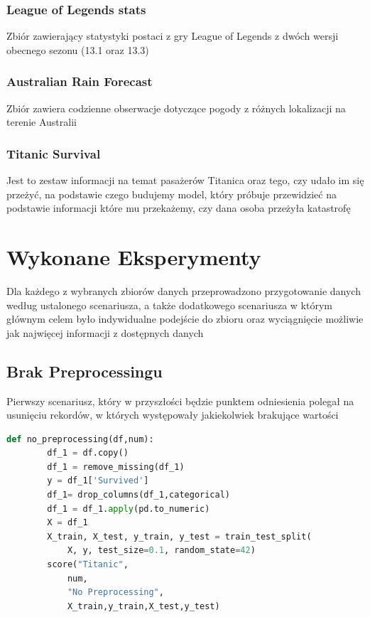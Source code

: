 \documentclass{book}
\begin{document}
\subsection{League of Legends stats}
Zbiór zawierający statystyki postaci z gry League of Legends z 
dwóch wersji obecnego sezonu (13.1 oraz 13.3)
\subsection{Australian Rain Forecast}
Zbiór zawiera codzienne obserwacje dotyczące pogody z różnych 
lokalizacji na terenie Australii
\subsection{Titanic Survival}
Jest to zestaw informacji na temat pasażerów Titanica oraz tego, 
czy udało im się przeżyć, na podstawie czego budujemy model, 
który próbuje przewidzieć na podstawie informacji które mu przekażemy, 
czy dana osoba przeżyła katastrofę

\chapter{Wykonane Eksperymenty}
Dla każdego z wybranych zbiorów danych przeprowadzono 
przygotowanie danych według ustalonego scenariusza, 
a także dodatkowego scenariusza w którym głównym celem było 
indywidualne podejście do zbioru oraz wyciągnięcie możliwie 
jak najwięcej informacji z dostępnych danych
\section{Brak Preprocessingu}
Pierwszy scenariusz, który w przyszłości 
będzie punktem odniesienia polegał na usunięciu rekordów, 
w których występowały jakiekolwiek brakujące wartości

\begin{lstlisting}[language=Python, caption={Brak przygotowania
     danych dla zbioru danych Titanic}, captionpos=b]
    def no_preprocessing(df,num):
        df_1 = df.copy()
        df_1 = remove_missing(df_1)
        y = df_1['Survived']
        df_1= drop_columns(df_1,categorical)
        df_1 = df_1.apply(pd.to_numeric)
        X = df_1
        X_train, X_test, y_train, y_test = train_test_split(
            X, y, test_size=0.1, random_state=42)
        score("Titanic",
            num,
            "No Preprocessing",
            X_train,y_train,X_test,y_test)
    \end{lstlisting}
\end{document}

